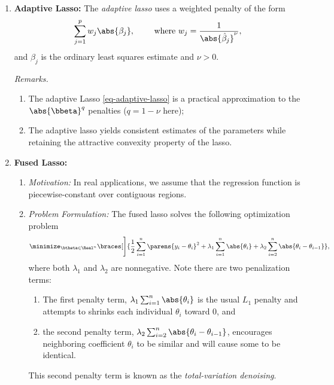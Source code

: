 \documentclass[12pt]{article}
\begin{document}
\begin{enumerate}[label=\textbf{\arabic*.}]
	\item \textbf{Adaptive Lasso:} The \emph{adaptive lasso} uses a weighted penalty of the form 
	\begin{align}\label{eq-adaptive-lasso}
		\sum_{j=1}^p w_j \abs{\beta_j}, \qquad \text{ where } w_j = \frac{1}{\abs{\hat{\beta}_j}^{\nu}}, 
	\end{align}
	and $\hat{\beta}_j$ is the ordinary least squares estimate and $\nu > 0$. 
	
	\textit{Remarks.}
	\begin{enumerate}
		\item The adaptive Lasso \eqref{eq-adaptive-lasso} is a practical approximation to the $\abs{\bbeta}^q$ penalties ($q = 1 - \nu$ here); 
		\item The adaptive lasso yields consistent estimates of the parameters while retaining the attractive convexity property of the lasso. 
	\end{enumerate}

	
	\item \textbf{Fused Lasso:} 
	\begin{enumerate}
		\item \textit{Motivation:} In real applications, we assume that the regression function is piecewise-constant over contiguous regions. 
		\item \textit{Problem Formulation:} The fused lasso solves the following optimization problem 
		\begin{align}\label{eq-fused-lasso}
			\minimize_{\btheta \in \Real^n} \braces[\Bigg]{\frac{1}{2} \sum_{i=1}^n \parens{y_i - \theta_i}^2 + \lambda_1 \sum_{i=1}^n \abs{\theta_i} + \lambda_2 \sum_{i=2}^n \abs{\theta_{i} - \theta_{i-1}}}, 
		\end{align}
		where both $\lambda_1$ and $\lambda_2$ are nonnegative. Note there are two penalization terms: 
		\begin{enumerate}
			\item The first penalty term, $\lambda_1 \sum_{i=1}^n \abs{\theta_i}$ is the usual $L_1$ penalty and attempts to shrinks each individual $\theta_i$ toward 0, and 
			\item the second penalty term, $\lambda_2 \sum_{i=2}^n \abs{\theta_{i} - \theta_{i-1}}$, encourages neighboring coefficient $\theta_i$ to be similar and will cause some to be identical. 
		\end{enumerate}
		This second penalty term is known as the \textit{total-variation denoising}. 
		

\end{enumerate}
\end{enumerate}
\end{document}
